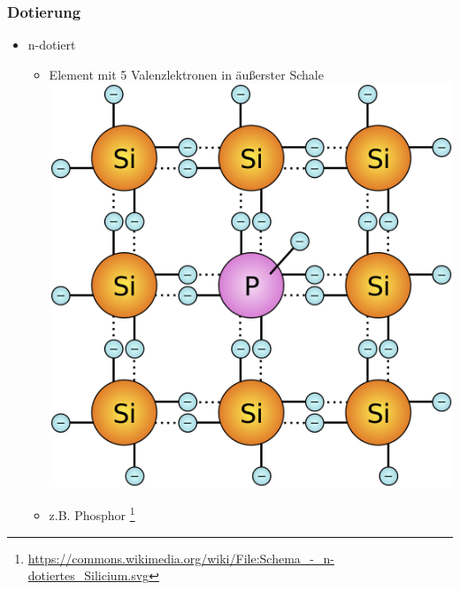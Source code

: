 \begin{frame}
    \frametitle{Dotierung}
      	\begin{itemize}
			\item n-dotiert
      		\begin{itemize}
				\item Element mit 5 Valenzlektronen in äußerster Schale
				 \includegraphics[height=.7\textheight]{e12/n-dot}
				 \item z.B. Phosphor
        \footnote{\tiny \url{https://commons.wikimedia.org/wiki/File:Schema_-_n-dotiertes_Silicium.svg}}
    	\end{itemize}
    \end{itemize}
\end{frame}




